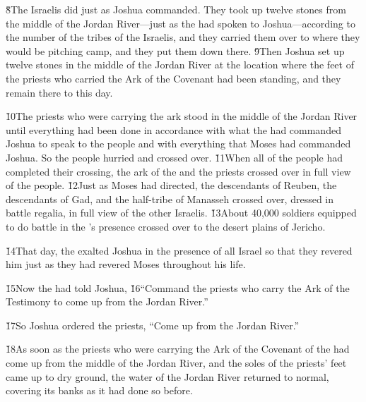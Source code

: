 \v{8}The Israelis did just as Joshua commanded. They took up twelve stones from the middle of the Jordan River---just as the  had spoken to Joshua---according to the number of the tribes of the Israelis, and they carried them over to where they would be pitching camp, and they put them down there. \v{9}Then Joshua set up twelve stones in the middle of the Jordan River at the location where the feet of the priests who carried the Ark of the Covenant had been standing, and they remain there to this day.

\v{10}The priests who were carrying the ark stood in the middle of the Jordan River until everything had been done in accordance with what the  had commanded Joshua to speak to the people and with everything that Moses had commanded Joshua. So the people hurried and crossed over. \v{11}When all of the people had completed their crossing, the ark of the  and the priests crossed over in full view of the people. \v{12}Just as Moses had directed, the descendants of Reuben, the descendants of Gad, and the half-tribe of Manasseh crossed over, dressed in battle regalia, in full view of the other Israelis. \v{13}About 40,000 soldiers equipped to do battle in the 's presence crossed over to the desert plains of Jericho.

\v{14}That day, the  exalted Joshua in the presence of all Israel so that they revered him just as they had revered Moses throughout his life.

\v{15}Now the  had told Joshua, \v{16}``Command the priests who carry the Ark of the Testimony to come up from the Jordan River.''

\v{17}So Joshua ordered the priests, ``Come up from the Jordan River.''

\v{18}As soon as the priests who were carrying the Ark of the Covenant of the  had come up from the middle of the Jordan River, and the soles of the priests' feet came up to dry ground, the water of the Jordan River returned to normal, covering its banks as it had done so before.

